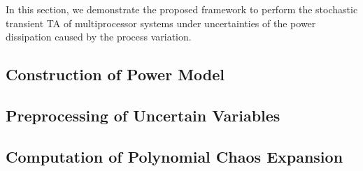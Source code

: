 In this section, we demonstrate the proposed framework to perform the stochastic transient TA of multiprocessor systems under uncertainties of the power dissipation caused by the process variation.

\subsection{Construction of Power Model} 


\subsection{Preprocessing of Uncertain Variables} 


\subsection{Computation of Polynomial Chaos Expansion} 

